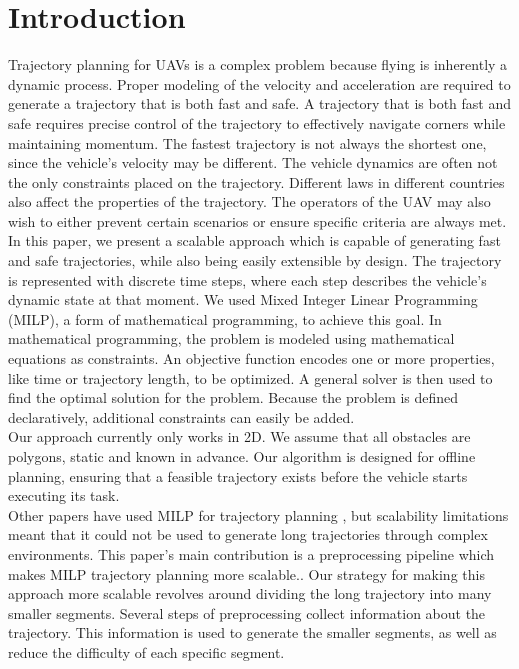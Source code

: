 \section{Introduction}
Trajectory planning for UAVs is a complex problem because flying is inherently a dynamic process. Proper modeling of the velocity and acceleration are required to generate a trajectory that is both fast and safe. A trajectory that is both fast and safe requires precise control of the trajectory to effectively navigate corners while maintaining momentum. The fastest trajectory is not always the shortest one, since the vehicle's velocity may be different. The vehicle dynamics are often not the only constraints placed on the trajectory. Different laws in different countries also affect the properties of the trajectory. The operators of the UAV may also wish to either prevent certain scenarios or ensure specific criteria are always met. \\
In this paper, we present a scalable approach which is capable of generating fast and safe trajectories, while also being easily extensible by design. The trajectory is represented with discrete time steps, where each step describes the vehicle's dynamic state at that moment. We used Mixed Integer Linear Programming (MILP), a form of mathematical programming, to achieve this goal. In mathematical programming, the problem is modeled using mathematical equations as constraints. An objective function encodes one or more properties, like time or trajectory length, to be optimized. A general solver is then used to find the optimal solution for the problem. Because the problem is defined declaratively, additional constraints can easily be added.\\
Our approach currently only works in 2D. We assume that all obstacles are polygons, static and known in advance. Our algorithm is designed for offline planning, ensuring that a feasible trajectory exists before the vehicle starts executing its task.\\
Other papers have used MILP for trajectory planning \cite{Schouwenaars2001}, but scalability limitations meant that it could not be used to generate long trajectories through complex environments. This paper's main contribution is a preprocessing pipeline which makes MILP trajectory planning more scalable.. Our strategy for making this approach more scalable revolves around dividing the long trajectory into many smaller segments. Several steps of preprocessing collect information about the trajectory. This information is used to generate the smaller segments, as well as reduce the difficulty of each specific segment. \\
